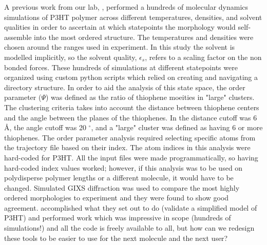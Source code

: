 A previous work from our lab, \citet{Miller2018}, performed a hundreds of molecular dynamics simulations of P3HT polymer across different temperatures, densities, and solvent qualities in order to ascertain at which statepoints the morphology would self-assemble into the most ordered structure.
The temperatures and densities were chosen around the ranges used in experiment.
In this study the solvent is modelled implicitly, so the solvent quality, $\epsilon_{s}$, refers to a scaling factor on the non bonded forces.
These hundreds of simulations at different statepoints were organized using custom python scripts which relied on creating and navigating a directory structure.
In order to aid the analysis of this state space, the order parameter ($\Psi$) was defined as the ratio of thiophene moeities in "large" clusters.
The clustering criteria takes into account the distance between thiophene centers and the angle between the planes of the thiophenes.
In \citet{Miller2018} the distance cutoff was 6 \AA, the angle cutoff was 20 $^{\circ}$, and a "large" cluster was defined as having 6 or more thiophenes.
The order parameter analysis required selecting specific atoms from the trajectory file based on their index.
The atom indices in this analysis were hard-coded for P3HT.
All the input files were made programmatically, so having hard-coded index values worked; however, if this analysis was to be used on polydisperse polymer lengths or a different molecule, it would have to be changed.
Simulated GIXS diffraction was used to compare the most highly ordered morphologies to experiment and they were found to show good agreement.
\citet{Miller2018} accomplished what they set out to do (validate a simplified model of P3HT) and performed work which was impressive in scope (hundreds of simulations!) and all the code is freely available to all, but how can we redesign these tools to be easier to use for the next molecule and the next user?

